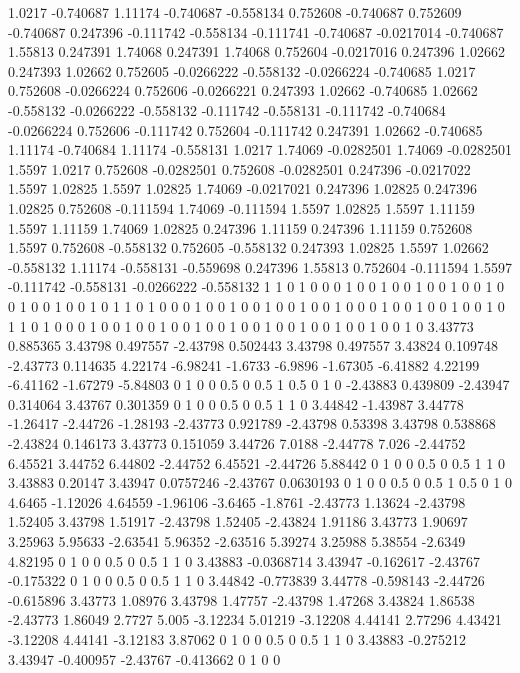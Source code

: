 1.0217 -0.740687
1.11174 -0.740687
-0.558134 0.752608
-0.740687 0.752609
-0.740687 0.247396
-0.111742 -0.558134
-0.111741 -0.740687
-0.0217014 -0.740687
1.55813 0.247391
1.74068 0.247391
1.74068 0.752604
-0.0217016 0.247396
1.02662 0.247393
1.02662 0.752605
-0.0266222 -0.558132
-0.0266224 -0.740685
1.0217 0.752608
-0.0266224 0.752606
-0.0266221 0.247393
1.02662 -0.740685
1.02662 -0.558132
-0.0266222 -0.558132
-0.111742 -0.558131
-0.111742 -0.740684
-0.0266224 0.752606
-0.111742 0.752604
-0.111742 0.247391
1.02662 -0.740685
1.11174 -0.740684
1.11174 -0.558131
1.0217 1.74069
-0.0282501 1.74069
-0.0282501 1.5597
1.0217 0.752608
-0.0282501 0.752608
-0.0282501 0.247396
-0.0217022 1.5597
1.02825 1.5597
1.02825 1.74069
-0.0217021 0.247396
1.02825 0.247396
1.02825 0.752608
-0.111594 1.74069
-0.111594 1.5597
1.02825 1.5597
1.11159 1.5597
1.11159 1.74069
1.02825 0.247396
1.11159 0.247396
1.11159 0.752608
1.5597 0.752608
-0.558132 0.752605
-0.558132 0.247393
1.02825 1.5597
1.02662 -0.558132
1.11174 -0.558131
-0.559698 0.247396
1.55813 0.752604
-0.111594 1.5597
-0.111742 -0.558131
-0.0266222 -0.558132
1 1
0 1
0 0
0 1
0 0
1 0
0 1
0 0
1 0
0 1
0 0
1 0
0 1
0 0
1 0
1 1
0 1
0 0
0 1
0 0
1 0
0 1
0 0
1 0
0 1
0 0
0 1
0 0
1 0
0 1
0 0
1 0
1 1
0 1
0 0
0 1
0 0
1 0
0 1
0 0
1 0
0 1
0 0
1 0
0 1
0 0
1 0
0 1
0 0
1 0
3.43773 0.885365
3.43798 0.497557
-2.43798 0.502443
3.43798 0.497557
3.43824 0.109748
-2.43773 0.114635
4.22174 -6.98241
-1.6733 -6.9896
-1.67305 -6.41882
4.22199 -6.41162
-1.67279 -5.84803
0 1
0 0
0.5 0
0.5 1
0.5 0
1 0
-2.43883 0.439809
-2.43947 0.314064
3.43767 0.301359
0 1
0 0
0.5 0
0.5 1
1 0
3.44842 -1.43987
3.44778 -1.26417
-2.44726 -1.28193
-2.43773 0.921789
-2.43798 0.53398
3.43798 0.538868
-2.43824 0.146173
3.43773 0.151059
3.44726 7.0188
-2.44778 7.026
-2.44752 6.45521
3.44752 6.44802
-2.44752 6.45521
-2.44726 5.88442
0 1
0 0
0.5 0
0.5 1
1 0
3.43883 0.20147
3.43947 0.0757246
-2.43767 0.0630193
0 1
0 0
0.5 0
0.5 1
0.5 0
1 0
4.6465 -1.12026
4.64559 -1.96106
-3.6465 -1.8761
-2.43773 1.13624
-2.43798 1.52405
3.43798 1.51917
-2.43798 1.52405
-2.43824 1.91186
3.43773 1.90697
3.25963 5.95633
-2.63541 5.96352
-2.63516 5.39274
3.25988 5.38554
-2.6349 4.82195
0 1
0 0
0.5 0
0.5 1
1 0
3.43883 -0.0368714
3.43947 -0.162617
-2.43767 -0.175322
0 1
0 0
0.5 0
0.5 1
1 0
3.44842 -0.773839
3.44778 -0.598143
-2.44726 -0.615896
3.43773 1.08976
3.43798 1.47757
-2.43798 1.47268
3.43824 1.86538
-2.43773 1.86049
2.7727 5.005
-3.12234 5.01219
-3.12208 4.44141
2.77296 4.43421
-3.12208 4.44141
-3.12183 3.87062
0 1
0 0
0.5 0
0.5 1
1 0
3.43883 -0.275212
3.43947 -0.400957
-2.43767 -0.413662
0 1
0 0
